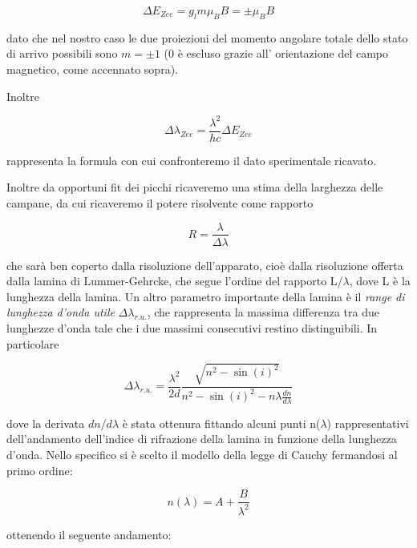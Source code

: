 \documentclass{article}
\begin{document}
	\begin{equation}
		\Delta E_{Zee} = g_l m \mu_B B = \pm \mu_B B
	\end{equation}
	
	
	dato che nel nostro caso le due proiezioni del momento angolare totale
	dello stato di arrivo possibili sono $m = \pm 1$ (0 è escluso grazie all'
	orientazione del campo magnetico, come accennato sopra).
	
	Inoltre
	
	\begin{equation}
		\Delta\lambda_{Zee} = \frac{\lambda^2}{hc}\Delta E_{Zee}
	\end{equation}
	
	rappresenta la formula con cui confronteremo il dato sperimentale
	ricavato.
	
	Inoltre da opportuni fit dei picchi ricaveremo una stima della larghezza
	delle campane, da cui ricaveremo il potere risolvente come rapporto
	
	\begin{equation}
		R = \frac{\lambda}{\Delta\lambda}    
	\end{equation}
	
	che sarà ben coperto dalla risoluzione dell'apparato, cioè dalla
	risoluzione offerta dalla lamina di Lummer-Gehrcke, che segue l'ordine
	del rapporto L/$\lambda$, dove L è la lunghezza della lamina.
	Un altro parametro importante della lamina è il \textit{range di 
		lunghezza d'onda utile} $\Delta\lambda_{r.u.}$, che rappresenta la
	massima differenza tra due lunghezze d'onda tale che i due massimi 
	consecutivi restino distinguibili. In particolare
	
	\begin{equation}
		\label{eqn:dlru}
		\Delta\lambda_{r.u.} = \frac{\lambda^2}{2d}\frac{\sqrt{n^2-\sin(i)^2}}{n^2-\sin(i)^2-n\lambda\frac{dn}{d\lambda}}
	\end{equation}
	
	dove la derivata $dn/d\lambda$ è stata ottenura fittando alcuni punti 
	n($\lambda$) rappresentativi dell'andamento dell'indice di rifrazione
	della lamina in funzione della lunghezza d'onda. Nello specifico si è
	scelto il modello della legge di Cauchy fermandosi al primo ordine:

	\begin{equation}
		n(\lambda) = A + \frac{B}{\lambda^2}    
	\end{equation}


	ottenendo il seguente andamento:
	
\end{document}
